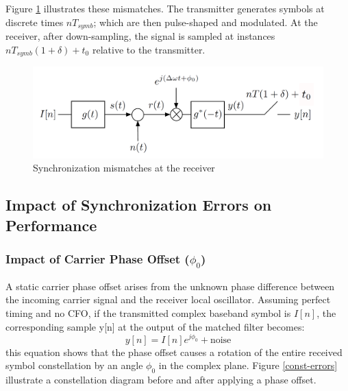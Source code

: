 Figure \ref{fig:sync-errors-conceptual} illustrates these mismatches. The transmitter generates symbols at discrete times $nT_{symb}$; which are then pulse-shaped and modulated. At the receiver, after down-sampling, the signal is sampled at instances $nT_{symb}(1+\delta)+t_0$ relative to the transmitter.
\begin{figure}[H]
	\centering
	\includegraphics[width=0.8\linewidth]{Images/sync-errors-conceptual}
	\caption{Synchronization mismatches at the receiver}
	\label{fig:sync-errors-conceptual}
\end{figure}

\subsection{Impact of Synchronization Errors on Performance}
\subsubsection{Impact of Carrier Phase Offset ($\phi_0$)}
A static carrier phase offset arises from the unknown phase difference between the incoming carrier signal and the receiver local oscillator. Assuming perfect timing and no CFO, if the transmitted complex baseband symbol is $I[n]$, the corresponding sample y[n] at the output of the matched filter becomes:
\begin{equation}
	y[n] = I[n]e^{j\phi_0} + \text{noise}
\end{equation}
this equation shows that the phase offset causes a rotation of the entire received symbol constellation by an angle $\phi_0$ in the complex plane.
Figure \ref{const-errors} illustrate a constellation diagram before and after applying a phase offset.

